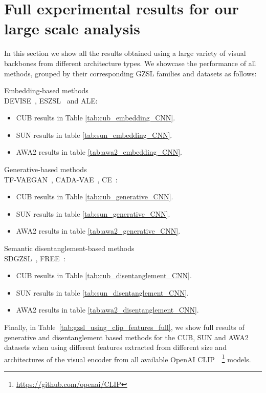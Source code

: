 \section{Full experimental results for our large scale analysis}
\label{sec:all_tables}

In this section we show all the results obtained using a large variety of visual backbones from different architecture types. We showcase the performance of all methods, grouped by their corresponding GZSL families and datasets as follows: 

\vfill\eject
\begin{compactitem}
  \item Embedding-based methods \\DEVISE~\cite{DeViSE}, ESZSL~\cite{ESZSL} and ALE\cite{ALE}:
  \begin{itemize}
    \item CUB results in Table \ref{tab:cub_embedding_CNN}. 
    \item SUN results in table \ref{tab:sun_embedding_CNN}.
    \item AWA2 results in table \ref{tab:awa2_embedding_CNN}. 
  \end{itemize}
  \item Generative-based methods \\TF-VAEGAN~\cite{tfvaegan}, CADA-VAE~\cite{CADA_VAE}, CE~\cite{CE}:
    \begin{itemize}
    \item CUB results in Table \ref{tab:cub_generative_CNN}. 
    \item SUN results in table \ref{tab:sun_generative_CNN}. 
    \item AWA2 results in table \ref{tab:awa2_generative_CNN}. 
  \end{itemize}
  \item Semantic disentanglement-based methods \\SDGZSL~\cite{SDGZSL}, FREE~\cite{Chen2021FREE}:
    \begin{itemize}
        \item CUB results in Table \ref{tab:cub_disentanglement_CNN}. 
        \item SUN results in table \ref{tab:sun_disentanglement_CNN}. 
        \item AWA2 results in table \ref{tab:awa2_disentanglement_CNN}. 
  \end{itemize}
\end{compactitem}





Finally, in Table~\ref{tab:gzsl_using_clip_features_full}, we show full results of generative and disentanglement based methods for the CUB, SUN and AWA2 datasets when using different features extracted from different size and architectures of the visual encoder from all available OpenAI CLIP~\cite{CLIP}~\footnote{\href{https://github.com/openai/CLIP}{https://github.com/openai/CLIP}} models. 





% 

